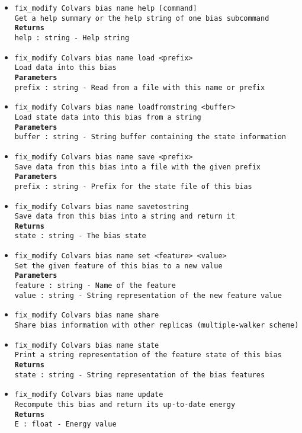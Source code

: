 \begin{itemize}
\item \texttt{fix\_modify Colvars bias name help [command]}
\\
\texttt{Get a help summary or the help string of one bias subcommand}
\\
\texttt{\textbf{Returns}}
\\
\texttt{help : string - Help string}
\item \texttt{fix\_modify Colvars bias name load <prefix>}
\\
\texttt{Load data into this bias}
\\
\texttt{\textbf{Parameters}}
\\
\texttt{prefix : string - Read from a file with this name or prefix}
\item \texttt{fix\_modify Colvars bias name loadfromstring <buffer>}
\\
\texttt{Load state data into this bias from a string}
\\
\texttt{\textbf{Parameters}}
\\
\texttt{buffer : string - String buffer containing the state information}
\item \texttt{fix\_modify Colvars bias name save <prefix>}
\\
\texttt{Save data from this bias into a file with the given prefix}
\\
\texttt{\textbf{Parameters}}
\\
\texttt{prefix : string - Prefix for the state file of this bias}
\item \texttt{fix\_modify Colvars bias name savetostring}
\\
\texttt{Save data from this bias into a string and return it}
\\
\texttt{\textbf{Returns}}
\\
\texttt{state : string - The bias state}
\item \texttt{fix\_modify Colvars bias name set <feature> <value>}
\\
\texttt{Set the given feature of this bias to a new value}
\\
\texttt{\textbf{Parameters}}
\\
\texttt{feature : string - Name of the feature}
\\
\texttt{value : string - String representation of the new feature value}
\item \texttt{fix\_modify Colvars bias name share}
\\
\texttt{Share bias information with other replicas (multiple-walker scheme)}
\item \texttt{fix\_modify Colvars bias name state}
\\
\texttt{Print a string representation of the feature state of this bias}
\\
\texttt{\textbf{Returns}}
\\
\texttt{state : string - String representation of the bias features}
\item \texttt{fix\_modify Colvars bias name update}
\\
\texttt{Recompute this bias and return its up-to-date energy}
\\
\texttt{\textbf{Returns}}
\\
\texttt{E : float - Energy value}
\end{itemize}
